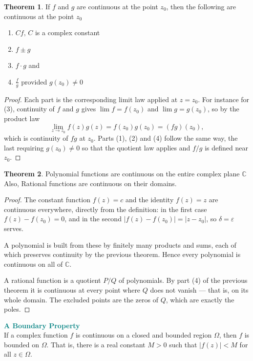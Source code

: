 \documentclass[11pt,a4paper]{article}
\theoremstyle{definition}
\newtheorem{thm}{Theorem}[section]
\begin{document}
\begin{thm}
If $f$ and $g$ are continuous at the point $z_0$, then the following are continuous at the point $z_0$
\begin{enumerate}
\item $Cf,\,C$ is a complex constant
\item $f\pm g$
\item $f\cdot g$ and 
\item $\frac{f}{g}$ provided $g(z_0)\neq 0$\\
\end{enumerate}

\begin{proof}
Each part is the corresponding limit law applied at $z=z_0$. For instance for
(3), continuity of $f$ and $g$ gives $\lim f=f(z_0)$ and $\lim g=g(z_0)$, so by
the product law
$$\lim_{z\rightarrow z_0}f(z)g(z)=f(z_0)g(z_0)=(fg)(z_0),$$
which is continuity of $fg$ at $z_0$. Parts (1), (2) and (4) follow the same
way, the last requiring $g(z_0)\neq 0$ so that the quotient law applies and
$f/g$ is defined near $z_0$.
\end{proof}
\end{thm}

\begin{thm}
Polynomial functions are continuous on the entire complex plane $\mathbb{C}$\\
Also, Rational functions are continuous on their domains.
\end{thm}

\begin{proof}
The constant function $f(z)=c$ and the identity $f(z)=z$ are continuous
everywhere, directly from the definition: in the first case $f(z)-f(z_0)=0$,
and in the second $\left|f(z)-f(z_0)\right|=\left|z-z_0\right|$, so $\delta=
\varepsilon$ serves.

A polynomial is built from these by finitely many products and sums, each of
which preserves continuity by the previous theorem. Hence every polynomial is
continuous on all of $\mathbb{C}$.

A rational function is a quotient $P/Q$ of polynomials. By part (4) of the
previous theorem it is continuous at every point where $Q$ does not vanish ---
that is, on its whole domain. The excluded points are the zeros of $Q$, which
are exactly the poles.
\end{proof}

\textbf{\textcolor{teal}{A Boundary Property}}\\
If a complex function $f$ is continuous on a closed and bounded region $\Omega$, then $f$ is bounded on $\Omega$. That is, there is a real constant $M> 0$ such that $\left|f(z)\right| < M$ for all $z\in \Omega$.\\\\
\end{document}
